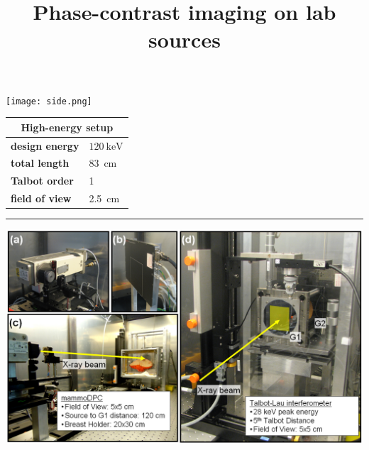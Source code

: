 \documentclass[a0,portrait]{a0poster}
\title{Phase-contrast imaging on lab sources}
\begin{document}

\maketitle

\thispagestyle{empty}

\vspace{1\baselineskip}

\centering
\texttt{[image: side.png]}

\vspace{2\baselineskip} %

\begin{minipage}[b]{0.58\linewidth}
\end{minipage}
\hspace*{\fill}
\begin{minipage}[b]{0.2\linewidth}
    \huge
    \vspace*{\fill}
\begin{tabular}{ll}
    \multicolumn{2}{c}{High-energy setup}\\[.5\baselineskip]
    \midrule
    \textbf{design energy} & $\SI{120}{\kilo\eV}$ \\
    \textbf{total length} & \SI{83}{\centi\metre} \\
    \textbf{Talbot order} & 1\\
    \textbf{field of view} & \SI{2.5}{\centi\metre}\\
\end{tabular}
    \vspace*{\fill}
\end{minipage}
\hspace*{\fill}

\vspace{2\baselineskip} %
\noindent\rule{\textwidth}{2pt}

\vspace{2\baselineskip} %
\includegraphics[width=\textwidth]{Figure1_V1.jpg}
\end{document}
